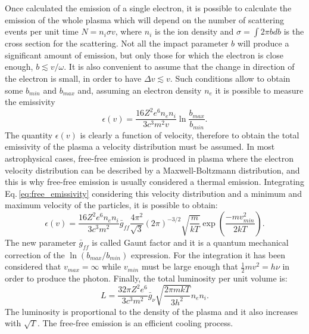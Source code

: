 \documentclass[../main.tex]{subfiles}
\begin{document}
Once calculated the emission of a single electron, it is possible to calculate the emission of the whole plasma which will depend on the number of scattering events per unit time $N = n_i \sigma v$, where $n_i$ is the ion density and $\sigma = \int 2\pi b db$ is the cross section for the scattering.
Not all the impact parameter $b$ will produce a significant amount of emission, but only those for which the electron is close enough, $b\lesssim v/\omega$. 
It is also convenient to assume that the change in direction of the electron is small, in order to have $\Delta v \lesssim v$.
Such conditions allow to obtain some $b_{min}$ and $b_{max}$ and, assuming an electron density $n_e$ it is possible to measure the emissivity
\begin{equation}
    \label{eq:free_emissivity} 
    \epsilon(v) = \frac{16 Z^2 e^6 n_e n_i}{3c^3m^2v}\ln\frac{b_{max}}{b_{min}}.
\end{equation}
The quantity $\epsilon(v)$ is clearly a function of velocity, therefore to obtain the total emissivity of the plasma a velocity distribution must be assumed.
In most astrophysical cases, free-free emission is produced in plasma where the electron velocity distribution can be described by a Maxwell-Boltzmann distribution, and this is why free-free emission is usually considered a thermal emission.
Integrating Eq.\,\ref{eq:free_emissivity} considering this velocity distribution and a minimum and maximum velocity of the particles, it is possible to obtain:
\begin{equation}
    \label{eq:free_emissivity_total}
    \epsilon(v) = \frac{16 Z^2 e^6 n_e n_i}{3c^3m^2}\bar{g}_{ff}\frac{4\pi^2}{\sqrt 3}(2\pi)^{-3/2}\sqrt{\frac{m}{kT}} \exp\left(\frac{-mv^2_{min}}{2kT}\right).
\end{equation}
The new parameter $\bar{g}_{ff}$ is called Gaunt factor and it is a quantum mechanical correction of the $\ln(b_{max}/b_{min})$ expression.
For the integration it has been considered that $v_{max} = \infty$ while $v_{min}$ must be large enough that $\frac{1}{2}mv^2 = h\nu$ in order to produce the photon.
Finally, the total luminosity per unit volume is:
\begin{equation}
    \label{eq:free_lum_tot}
    L=\frac{32 \pi Z^2 e^6}{3c^3m^2}\bar{g}_{\nu}\sqrt{\frac{2 \pi m k T}{3h^2}}n_e n_i.
\end{equation}
The luminosity is proportional to the density of the plasma and it also increases with $\sqrt T$.
The free-free emission is an efficient cooling process.
\end{document}
